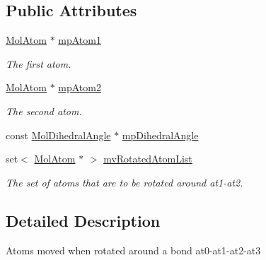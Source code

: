 \subsection*{Public Attributes}
\begin{DoxyCompactItemize}
\item 
\mbox{\label{struct_obj_cryst_1_1_stretch_mode_torsion_a634c5b17f5b6fec260556256c8f8c6a2}} 
\mbox{\hyperlink{class_obj_cryst_1_1_mol_atom}{Mol\+Atom}} $\ast$ \mbox{\hyperlink{struct_obj_cryst_1_1_stretch_mode_torsion_a634c5b17f5b6fec260556256c8f8c6a2}{mp\+Atom1}}
\begin{DoxyCompactList}\small\item\em The first atom. \end{DoxyCompactList}\item 
\mbox{\label{struct_obj_cryst_1_1_stretch_mode_torsion_a6efdb86745541ac989f8cd703d1919d0}} 
\mbox{\hyperlink{class_obj_cryst_1_1_mol_atom}{Mol\+Atom}} $\ast$ \mbox{\hyperlink{struct_obj_cryst_1_1_stretch_mode_torsion_a6efdb86745541ac989f8cd703d1919d0}{mp\+Atom2}}
\begin{DoxyCompactList}\small\item\em The second atom. \end{DoxyCompactList}\item 
const \mbox{\hyperlink{class_obj_cryst_1_1_mol_dihedral_angle}{Mol\+Dihedral\+Angle}} $\ast$ \mbox{\hyperlink{struct_obj_cryst_1_1_stretch_mode_torsion_a93128fa32715a53d1ecc6758283f8641}{mp\+Dihedral\+Angle}}
\item 
\mbox{\label{struct_obj_cryst_1_1_stretch_mode_torsion_ad20b18eb2901e1f0c94af520c2defd1b}} 
set$<$ \mbox{\hyperlink{class_obj_cryst_1_1_mol_atom}{Mol\+Atom}} $\ast$ $>$ \mbox{\hyperlink{struct_obj_cryst_1_1_stretch_mode_torsion_ad20b18eb2901e1f0c94af520c2defd1b}{mv\+Rotated\+Atom\+List}}
\begin{DoxyCompactList}\small\item\em The set of atoms that are to be rotated around at1-\/at2. \end{DoxyCompactList}\end{DoxyCompactItemize}


\subsection{Detailed Description}
Atoms moved when rotated around a bond at0-\/at1-\/at2-\/at3

